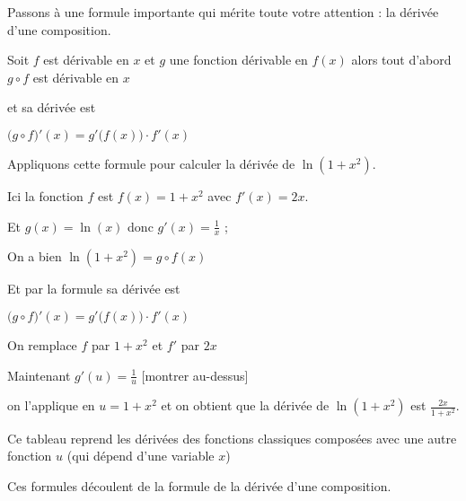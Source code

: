 \diapo

Passons à une formule importante qui mérite toute votre attention : la dérivée d'une composition.

Soit $f$ est dérivable en $x$ et $g$ une fonction dérivable en $f(x)$ 
alors tout d'abord  $g\circ f$ est
dérivable en $x$

\change
 et sa dérivée est

$\big( g \circ f \big)'(x) = g'\big( f(x) \big) \cdot f'(x)$


\change

Appliquons cette formule pour calculer la dérivée de $\ln(1+x^2)$.

\change

Ici la fonction $f$ est  $f(x)=1+x^2$ avec  $f'(x) = 2x$.

\change

Et $g(x)=\ln(x)$ donc  $g'(x) = \frac 1x$ ; 

\change

On a bien $\ln(1+x^2)=g\circ f(x)$

\change

Et par la formule sa dérivée est

$\big( g \circ f \big)'(x) = g'\big( f(x) \big) \cdot f'(x)$

\change

On remplace $f$ par $1+x^2$ et $f'$ par $2x$

Maintenant  $g'(u) = \frac 1u$ [montrer au-dessus]

\change

on l'applique en $u=1+x^2$ et on obtient que 
la dérivée de $\ln(1+x^2)$ est $\frac{2x}{1+x^2}.$

\diapo

Ce tableau reprend les dérivées des fonctions classiques composées avec une autre fonction $u$ (qui dépend d'une variable $x$)

Ces formules découlent de la formule de la dérivée d'une composition.


